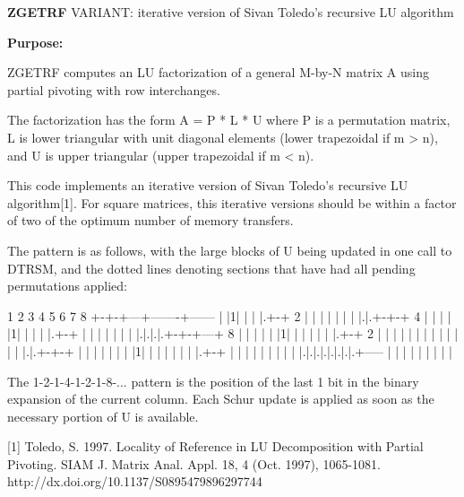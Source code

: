 {\bfseries Z\+G\+E\+T\+R\+F} V\+A\+R\+I\+A\+N\+T\+: iterative version of Sivan Toledo's recursive L\+U algorithm 

{\bfseries Purpose\+:} \begin{DoxyVerb} ZGETRF computes an LU factorization of a general M-by-N matrix A
 using partial pivoting with row interchanges.

 The factorization has the form
    A = P * L * U
 where P is a permutation matrix, L is lower triangular with unit
 diagonal elements (lower trapezoidal if m > n), and U is upper
 triangular (upper trapezoidal if m < n).

 This code implements an iterative version of Sivan Toledo's recursive
 LU algorithm[1].  For square matrices, this iterative versions should
 be within a factor of two of the optimum number of memory transfers.

 The pattern is as follows, with the large blocks of U being updated
 in one call to DTRSM, and the dotted lines denoting sections that
 have had all pending permutations applied:

  1 2 3 4 5 6 7 8
 +-+-+---+-------+------
 | |1|   |       |
 |.+-+ 2 |       |
 | | |   |       |
 |.|.+-+-+   4   |
 | | | |1|       |
 | | |.+-+       |
 | | | | |       |
 |.|.|.|.+-+-+---+  8
 | | | | | |1|   |
 | | | | |.+-+ 2 |
 | | | | | | |   |
 | | | | |.|.+-+-+
 | | | | | | | |1|
 | | | | | | |.+-+
 | | | | | | | | |
 |.|.|.|.|.|.|.|.+-----
 | | | | | | | | |

 The 1-2-1-4-1-2-1-8-... pattern is the position of the last 1 bit in
 the binary expansion of the current column.  Each Schur update is
 applied as soon as the necessary portion of U is available.

 [1] Toledo, S. 1997. Locality of Reference in LU Decomposition with
 Partial Pivoting. SIAM J. Matrix Anal. Appl. 18, 4 (Oct. 1997),
 1065-1081. http://dx.doi.org/10.1137/S0895479896297744\end{DoxyVerb}
 
